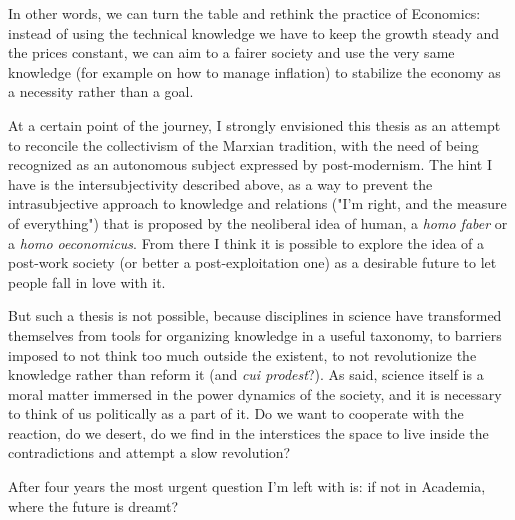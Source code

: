 In other words, we can turn the table and rethink the practice of Economics: instead of using the technical knowledge we have to keep the growth steady and the prices constant, we can aim to a fairer society and use the very same knowledge (for example on how to manage inflation) to stabilize the economy as a necessity rather than a goal.

At a certain point of the journey, I strongly envisioned this thesis as an attempt to reconcile the collectivism of the Marxian tradition, with the need of being recognized as an autonomous subject expressed by post-modernism.
The hint I have is the intersubjectivity described above, as a way to prevent the intrasubjective approach to knowledge and relations ("I'm right, and the measure of everything") that is proposed by the neoliberal idea of human, a \textit{homo faber} or a \textit{homo oeconomicus}.
From there I think it is possible to explore the idea of a post-work society (or better a post-exploitation one) as a desirable future to let people fall in love with it.

But such a thesis is not possible, because disciplines in science have transformed themselves from tools for organizing knowledge in a useful taxonomy, to barriers imposed to not think too much outside the existent, to not revolutionize the knowledge rather than reform it (and \textit{cui prodest}?).
As said, science itself is a moral matter immersed in the power dynamics of the society, and it is necessary to think of us politically as a part of it. Do we want to cooperate with the reaction, do we desert, do we find in the interstices the space to live inside the contradictions and attempt a slow revolution?

After four years the most urgent question I'm left with is: if not in Academia, where the future is dreamt?